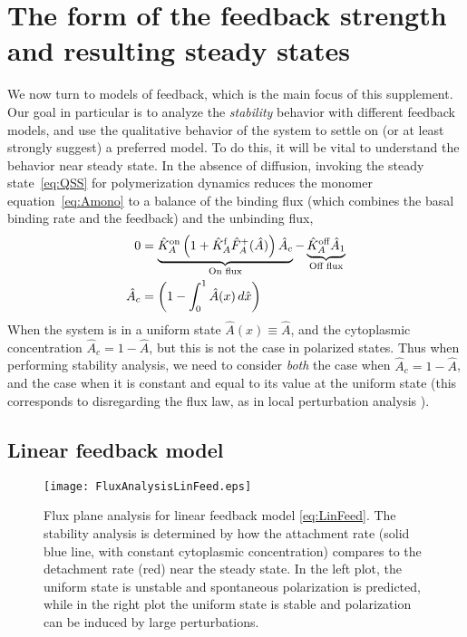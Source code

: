 \documentclass[11pt]{article}
\newcommand{\6}[1]{#1_{\text{6}}}
\newcommand{\3}[1]{#1_{\text{3}}}
\begin{document}
\section{The form of the feedback strength and resulting steady states}
We now turn to models of feedback, which is the main focus of this supplement. Our goal in particular is to analyze the \emph{stability} behavior with different feedback models, and use the qualitative behavior of the system to settle on (or at least strongly suggest) a preferred model. To do this, it will be vital to understand the behavior near steady state. In the absence of diffusion, invoking the steady state\ \eqref{eq:QSS} for polymerization dynamics reduces the monomer equation\ \eqref{eq:Amono} to a balance of the binding flux (which combines the basal binding rate and the feedback) and the unbinding flux,
\begin{align}
\label{eq:MonSS}
0&= \underbrace{\hat{K}^\text{on}_A \left(1+\hat{K}^\text{f}_A \hat F_A^+(\hat A) \right)\hat A_c}_\text{On flux} - \underbrace{\hat{K}^\text{off}_A  \hat A_1}_\text{Off flux}\\ \nonumber
\hat A_c &= \left(1 - \int_0^1 \hat A(x) \, d\hat{x} \right)
\end{align}
When the system is in a uniform state $\hat A(x) \equiv \hat A$, and the cytoplasmic concentration $\hat A_c = 1-\hat A$, but this is not the case in polarized states. Thus when performing stability analysis, we need to consider \emph{both} the case when $\hat A_c = 1-\hat A$, and the case when it is constant and equal to its value at the uniform state (this corresponds to disregarding the flux law, as in local perturbation analysis \cite{holmes2015local}). 

\subsection{Linear feedback model}
\begin{figure}
\centering
\texttt{[image: FluxAnalysisLinFeed.eps]}
\caption{\label{fig:P3Linear}Flux plane analysis for linear feedback model \eqref{eq:LinFeed}. The stability analysis is determined by how the attachment rate (solid blue line, with constant cytoplasmic concentration) compares to the detachment rate (red) near the steady state. In the left plot, the uniform state is unstable and spontaneous polarization is predicted, while in the right plot the uniform state is stable and polarization can be induced by large perturbations.}
\end{figure}
\end{document}
